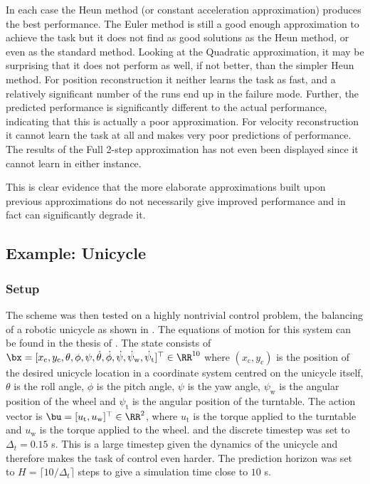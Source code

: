 In each case the Heun method (or constant acceleration approximation) produces the best performance. The Euler method is still a good enough approximation to achieve the task but it does not find as good solutions as the Heun method, or even as the standard method. Looking at the Quadratic approximation, it may be surprising that it does not perform as well, if not better, than the simpler Heun method. For position reconstruction it neither learns the task as fast, and a relatively significant number of the runs end up in the failure mode. Further, the predicted performance is significantly different to the actual performance, indicating that this is actually a poor approximation. For velocity reconstruction it cannot learn the task at all and makes very poor predictions of performance. The results of the Full 2-step approximation has not even been displayed since it cannot learn in either instance.

This is clear evidence that the more elaborate approximations built upon previous approximations do not necessarily give improved performance and in fact can significantly degrade it.









\subsection{Example: Unicycle} \label{sec:unicycle}

\subsubsection{Setup}
The scheme was then tested on a highly nontrivial control problem, the balancing of a robotic unicycle as shown in . The equations of motion for this system can be found in the thesis of \cite{For09}. The state consists of $\bx = [x_\text{c}, y_\text{c}, \theta, \phi, \psi, \dot\theta, \dot\phi, \dot\psi, \dot\psi_\text{w}, \dot\psi_\text{t}]^\top \in \RR^{10}$ where $(x_\text{c},y_\text{c})$ is the position of the desired unicycle location in a coordinate system centred on the unicycle itself, $\theta$ is the roll angle, $\phi$ is the pitch angle, $\psi$ is the yaw angle, $\psi_\text{w}$ is the angular position of the wheel and $\psi_\text{t}$ is the angular position of the turntable. The action vector is $\bu = [u_\text{t}, u_\text{w}]^\top \in \RR^2$, where $u_\text{t}$ is the torque applied to the turntable and $u_\text{w}$ is the torque applied to the wheel.  and the discrete timestep was set to $\Delta_t = 0.15\!$ s. This is a large timestep given the dynamics of the unicycle and therefore makes the task of control even harder. The prediction horizon was set to $H = \big\lceil 10/\Delta_t \big\rceil$ steps to give a simulation time close to $10\!$ s.

